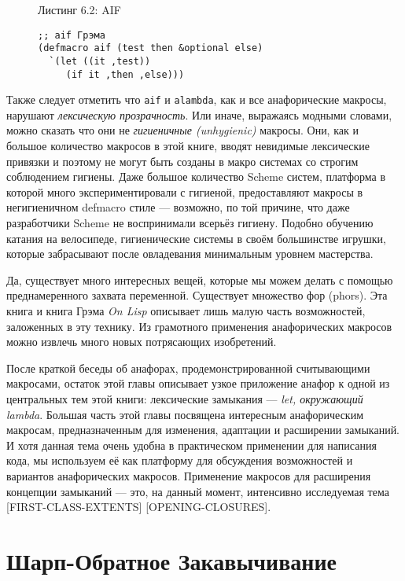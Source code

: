 \begin{figure}Листинг 6.2: AIF\label{listing_6.2}
\listbegin
\begin{verbatim}
;; aif Грэма
(defmacro aif (test then &optional else)
  `(let ((it ,test))
     (if it ,then ,else)))
\end{verbatim}
\listend
\end{figure}

Также следует отметить что \verb"aif" и \verb"alambda", как и все анафорические макросы, нарушают \emph{лексическую прозрачность}. Или иначе, выражаясь модными словами, можно сказать что они не \emph{гигиеничные (unhygienic)} макросы. Они, как и большое количество макросов в этой книге, вводят невидимые лексические привязки и поэтому не могут быть созданы в макро системах со строгим соблюдением гигиены. Даже большое количество Scheme систем, платформа в которой много экспериментировали с гигиеной, предоставляют макросы в негигиеничном defmacro стиле --- возможно, по той причине, что даже разработчики Scheme не воспринимали всерьёз гигиену. Подобно обучению катания на велосипеде, гигиенические системы в своём большинстве игрушки, которые забрасывают после овладевания минимальным уровнем мастерства.

Да, существует много интересных вещей, которые мы можем делать с помощью преднамеренного захвата переменной. Существует множество фор (phors). Эта книга и книга Грэма \emph{On Lisp} описывает лишь малую часть возможностей, заложенных в эту технику. Из грамотного применения анафорических макросов можно извлечь много новых потрясающих изобретений.

После краткой беседы об анафорах, продемонстрированной считывающими макросами, остаток этой главы описывает узкое приложение анафор к одной из центральных тем этой книги: лексические замыкания --- \emph{let, окружающий lambda}. Большая часть этой главы посвящена интересным анафорическим макросам, предназначенным для изменения, адаптации и расширении замыканий. И хотя данная тема очень удобна в практическом применении для написания кода, мы используем её как платформу для обсуждения возможностей и вариантов анафорических макросов. Применение макросов для расширения концепции замыканий --- это, на данный момент, интенсивно исследуемая тема [FIRST-CLASS-EXTENTS] [OPENING-CLOSURES].

\section{Шарп-Обратное Закавычивание}\label{section_sharp-backquote} 

